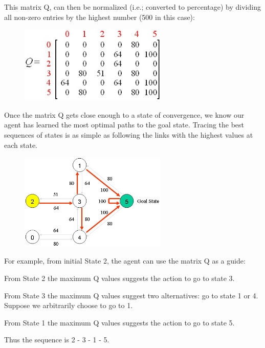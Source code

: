 \documentclass[a4paper, 11pt]{article}
\begin{document}
This matrix Q, can then be normalized (i.e.; converted to percentage) by dividing all non-zero entries by the highest number (500 in this case):

\begin{figure}[H]
\centering
\includegraphics[width=7cm]{fig/q_matrix5}
\end{figure}

Once the matrix Q gets close enough to a state of convergence, we know our agent has learned the most optimal paths to the goal state.  Tracing the best sequences of states is as simple as following the links with the highest values at each state.

\begin{figure}[H]
\centering
\includegraphics[width=7cm]{fig/map5}
\end{figure}

For example, from initial State 2, the agent can use the matrix Q as a guide:

From State 2 the maximum Q values suggests the action to go to state 3.

From State 3 the maximum Q values suggest two alternatives: go to state 1 or 4.  Suppose we arbitrarily choose  to go to 1.

From State 1 the maximum Q values suggests the action to go to state 5.

Thus the sequence is 2 - 3 - 1 - 5.
\end{document}
